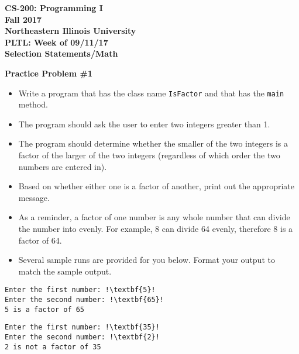 \documentclass[12pt]{article}
\begin{document}
\begin{center}
	\textbf{CS-200: Programming I}\\
	\textbf{Fall 2017}\\
	\textbf{Northeastern Illinois University}\\
	\textbf{PLTL: Week of 09/11/17}\\
	\textbf{Selection Statements/Math}
\end{center}

\noindent\textbf{Practice Problem \#1}
\begin{itemize}
	\item Write a program that has the class name \texttt{IsFactor} and that has the \texttt{main} method.
	\item The program should ask the user to enter two integers greater than 1.
	\item The program should determine whether the smaller of the two integers is a factor of the larger of the two integers (regardless of which order the two numbers are entered in). 
	\item Based on whether either one is a factor of another, print out the appropriate message.
	\item As a reminder, a factor of one number is any whole number that can divide the number into evenly. For example, 8 can divide 64 evenly, therefore 8 is a factor of 64. 
	\item Several sample runs are provided for you below. Format your output to match the sample output.
\end{itemize}
\begin{center}
\begin{minipage}{4.5cm}
\begin{lstlisting}[escapechar=!]
Enter the first number: !\textbf{5}!
Enter the second number: !\textbf{65}!
5 is a factor of 65
\end{lstlisting}
\end{minipage}
\hspace*{0.5cm}
\begin{minipage}{4.5cm}
\begin{lstlisting}[escapechar=!]
Enter the first number: !\textbf{35}!
Enter the second number: !\textbf{2}!
2 is not a factor of 35
\end{lstlisting}
\end{minipage}
\end{center}
\end{document}

